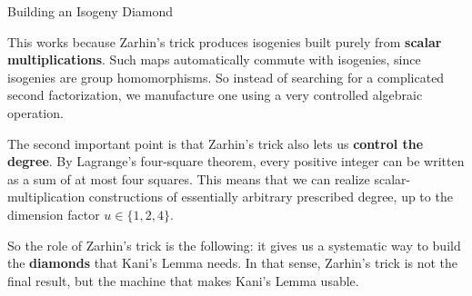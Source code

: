 \documentclass[aspectratio=169,notheorems]{beamer}
\begin{document}
\begin{frame}{Building an Isogeny Diamond}
{			This works because Zarhin's trick produces isogenies built purely from \textbf{scalar multiplications}. Such maps automatically commute with isogenies, since isogenies are group homomorphisms. So instead of searching for a complicated second factorization, we manufacture one using a very controlled algebraic operation.
			
			The second important point is that Zarhin's trick also lets us \textbf{control the degree}. By Lagrange's four-square theorem, every positive integer can be written as a sum of at most four squares. This means that we can realize scalar-multiplication constructions of essentially arbitrary prescribed degree, up to the dimension factor \(u \in \{1,2,4\}\).
			
			So the role of Zarhin's trick is the following: it gives us a systematic way to build the \textbf{diamonds} that Kani's Lemma needs. In that sense, Zarhin's trick is not the final result, but the machine that makes Kani's Lemma usable.
		}
	\end{frame}
	
\end{document}
